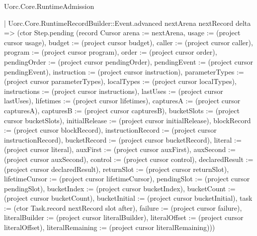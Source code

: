 \begin{lexlean}{Uorc.Core.RuntimeAdmission}
\begin{semanticmodule}
{      | Uorc.Core.RuntimeRecordBuilder::Event.advanced nextArena nextRecord delta => (ctor Step.pending (record Cursor {arena := nextArena, usage := (project cursor usage), budget := (project cursor budget), caller := (project cursor caller), program := (project cursor program), order := (project cursor order), pendingOrder := (project cursor pendingOrder), pendingEvent := (project cursor pendingEvent), instruction := (project cursor instruction), parameterTypes := (project cursor parameterTypes), localTypes := (project cursor localTypes), instructions := (project cursor instructions), lastUses := (project cursor lastUses), lifetimes := (project cursor lifetimes), capturesA := (project cursor capturesA), capturesB := (project cursor capturesB), bucketSlots := (project cursor bucketSlots), initialRelease := (project cursor initialRelease), blockRecord := (project cursor blockRecord), instructionRecord := (project cursor instructionRecord), bucketRecord := (project cursor bucketRecord), literal := (project cursor literal), auxFirst := (project cursor auxFirst), auxSecond := (project cursor auxSecond), control := (project cursor control), declaredResult := (project cursor declaredResult), returnSlot := (project cursor returnSlot), lifetimeCursor := (project cursor lifetimeCursor), pendingSlot := (project cursor pendingSlot), bucketIndex := (project cursor bucketIndex), bucketCount := (project cursor bucketCount), bucketInitial := (project cursor bucketInitial), task := (ctor Task.record nextRecord slot after), failure := (project cursor failure), literalBuilder := (project cursor literalBuilder), literalOffset := (project cursor literalOffset), literalRemaining := (project cursor literalRemaining)}))
}
\end{semanticmodule}
\end{lexlean}
